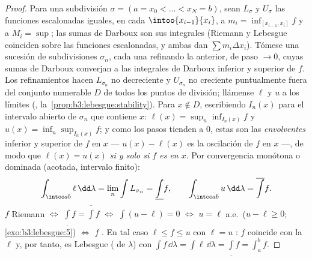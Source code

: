 \begin{proof}
Para una subdivisión $\sigma = (a = x_0 < \dots < x_N = b)$, sean
$L_\sigma$ y $U_\sigma$ las funciones escalonadas iguales, en cada
$\intoo{x_{i-1}}{x_i}$, a $m_i = \inf_{[x_{i-1}, x_i]}f$ y a
$M_i = \sup$; las sumas de Darboux son sus integrales (Riemann y
Lebesgue coinciden sobre las funciones escalonadas, y ambas dan $\sum
m_i\Delta x_i$). Tómese una sucesión de subdivisiones $\sigma_n$, cada
una refinando la anterior, de paso $\to 0$, cuyas sumas de Darboux
converjan a las integrales de Darboux inferior y superior de $f$. Los
refinamientos hacen $L_{\sigma_n}$ no decreciente y $U_{\sigma_n}$ no
creciente puntualmente fuera del conjunto numerable $D$ de todos los
puntos de división; llámense $\ell$ y $u$ a los límites
(,
la~\cref{prop:b3:lebesgue:stability}). Para $x \notin
D$, escribiendo $I_n(x)$ para el intervalo abierto de $\sigma_n$ que
contiene $x$: $\ell(x) = \sup_n\inf_{I_n(x)}f$ y $u(x) =
\inf_n\sup_{I_n(x)}f$; y como los pasos tienden a $0$, estas son las
\emph{envolventes} inferior y superior de $f$ en $x$ ---
$u(x) - \ell(x)$ es la oscilación de $f$ en $x$ ---, de modo que
\emph{$\ell(x) = u(x)$ si y solo si $f$ es
 en $x$}. Por convergencia
monótona o dominada (acotada, intervalo finito):
\[
\int_{\intcc ab}\ell\,\dd\lambda = \lim_n\int L_{\sigma_n}
= \underline{\int}f,
\qquad
\int_{\intcc ab}u\,\dd\lambda = \overline{\int}f .
\]
$f$  Riemann $\iff$
$\underline\int f =
\overline\int f$ $\iff$ $\int(u - \ell) = 0$ $\iff$ $u = \ell$
a.e.\ ($u - \ell \geq 0$; \cref{exo:b3:lebesgue:5}) $\iff$ $f$
 . En tal
caso $\ell \leq f \leq u$ con $\ell =
u$ : $f$ coincide  con la $\ell$
 y, por tanto, es
 Lebesgue
( de $\lambda$) con
$\int f\,\dd\lambda = \int\ell\,\dd\lambda = \underline\int f =
\int_a^bf$.
\end{proof}

